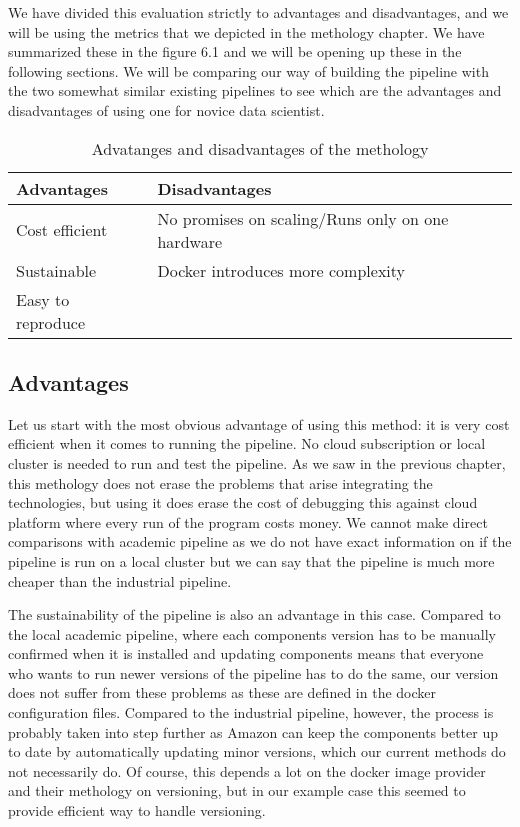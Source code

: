 We have divided this evaluation strictly to advantages and disadvantages, and we will be using the metrics that we depicted in the methology chapter.
We have summarized these in the figure 6.1 and we will be opening up these in the following sections.
We will be comparing our way of building the pipeline with the two somewhat similar existing pipelines to see which are the advantages and disadvantages of using one for novice data scientist.

\begin{table}[! htbp]\centering 
  \caption{Advatanges and disadvantages of the methology}
  \begin{threeparttable}
      \begin{tabular}{|p{6cm}|p{6cm}|}
      \hline
      Advantages & Disadvantages \\ \hline
      Cost efficient & No promises on scaling/Runs only on one hardware \\ 
      Sustainable & Docker introduces more complexity \\ 
      Easy to reproduce & \\ \hline
      \end{tabular}
  \end{threeparttable}
\end{table}

\subsection{Advantages}

Let us start with the most obvious advantage of using this method: it is very cost efficient when it comes to running the pipeline.
No cloud subscription or local cluster is needed to run and test the pipeline.
As we saw in the previous chapter, this methology does not erase the problems that arise integrating the technologies, but using it does erase the cost of debugging this against cloud platform where every run of the program costs money.
We cannot make direct comparisons with academic pipeline as we do not have exact information on if the pipeline is run on a local cluster but we can say that the pipeline is much more cheaper than the industrial pipeline.

The sustainability of the pipeline is also an advantage in this case.
Compared to the local academic pipeline, where each components version has to be manually confirmed when it is installed and updating components means that everyone who wants to run newer versions of the pipeline has to do the same, our version does not suffer from these problems as these are defined in the docker configuration files.
Compared to the industrial pipeline, however, the process is probably taken into step further as Amazon can keep the components better up to date by automatically updating minor versions, which our current methods do not necessarily do.
Of course, this depends a lot on the docker image provider and their methology on versioning, but in our example case this seemed to provide efficient way to handle versioning.

